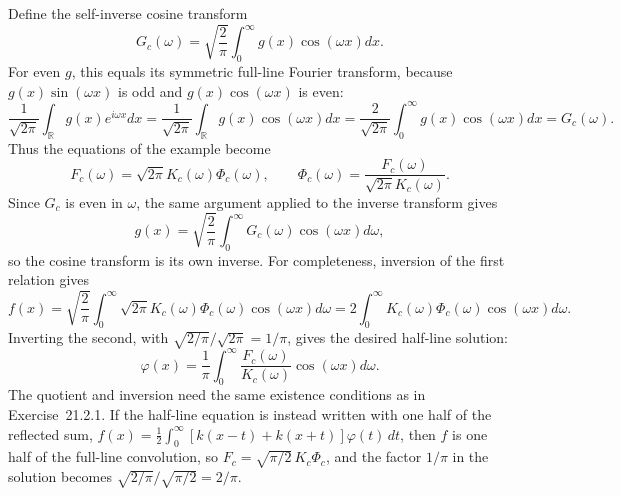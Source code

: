 Define the self-inverse cosine transform
\[
G_c(\omega)=\sqrt{\frac2\pi}\int_0^\infty
g(x)\cos(\omega x)dx.
\]
For even $g$, this equals its symmetric full-line Fourier transform,
because $g(x)\sin(\omega x)$ is odd and $g(x)\cos(\omega x)$ is even:
\[
\frac1{\sqrt{2\pi}}\int_{\mathbb R}g(x)e^{i\omega x}dx
=\frac1{\sqrt{2\pi}}\int_{\mathbb R}g(x)\cos(\omega x)dx
=\frac2{\sqrt{2\pi}}\int_0^\infty g(x)\cos(\omega x)dx
=G_c(\omega).
\]
Thus the equations of the example become
\[
F_c(\omega)=\sqrt{2\pi}K_c(\omega)\Phi_c(\omega),\qquad
\Phi_c(\omega)=\frac{F_c(\omega)}{\sqrt{2\pi}K_c(\omega)}.
\]
Since $G_c$ is even in $\omega$, the same argument applied to the
inverse transform gives
\[
g(x)=\sqrt{\frac2\pi}\int_0^\infty G_c(\omega)\cos(\omega x)d\omega,
\]
so the cosine transform is its own inverse. For completeness, inversion
of the first relation gives
\[
f(x)=\sqrt{\frac2\pi}\int_0^\infty\sqrt{2\pi}K_c(\omega)\Phi_c(\omega)
\cos(\omega x)d\omega
=2\int_0^\infty K_c(\omega)\Phi_c(\omega)
\cos(\omega x)d\omega.
\]
Inverting the second, with $\sqrt{2/\pi}/\sqrt{2\pi}=1/\pi$, gives the
desired half-line solution:
\[
\boxed{\varphi(x)=\frac1\pi\int_0^\infty
\frac{F_c(\omega)}{K_c(\omega)}\cos(\omega x)d\omega}.
\]
The quotient and inversion need the same existence conditions as in
Exercise~21.2.1. If the half-line equation is instead written with one
half of the reflected sum,
$f(x)=\frac12\int_0^\infty[k(x-t)+k(x+t)]\varphi(t)\,dt$, then $f$ is
one half of the full-line convolution, so $F_c=\sqrt{\pi/2}\,K_c\Phi_c$,
and the factor $1/\pi$ in the solution becomes
$\sqrt{2/\pi}/\sqrt{\pi/2}=2/\pi$.


